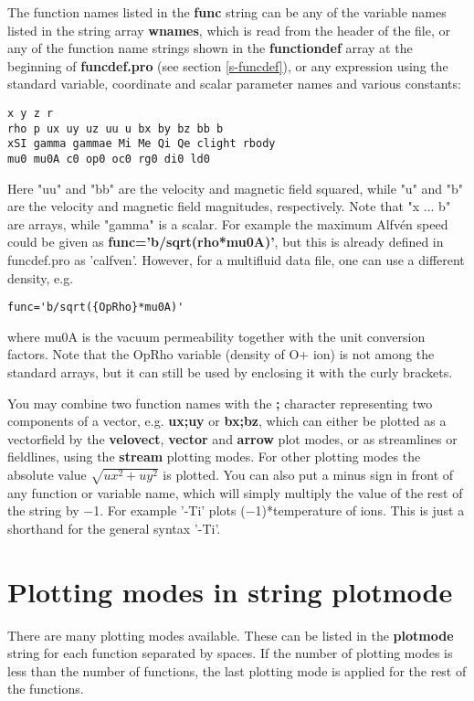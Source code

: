 \documentclass{article}
\begin{document}
   The function names listed in the {\bf func} string can be any of 
   the variable names listed in the string array {\bf wnames}, which is 
   read from the header of the file, or any of the function name strings 
   shown in the {\bf functiondef} array at the beginning of
   {\bf funcdef.pro} (see section \ref{s-funcdef}), 
   or any expression using the standard variable, 
   coordinate and scalar parameter names and various constants:
\begin{verbatim}
x y z r
rho p ux uy uz uu u bx by bz bb b
xSI gamma gammae Mi Me Qi Qe clight rbody
mu0 mu0A c0 op0 oc0 rg0 di0 ld0
\end{verbatim}
   Here "uu" and "bb" are the velocity and magnetic field squared, while
   "u" and "b" are the velocity and magnetic field magnitudes, 
   respectively. Note that "x ... b" are arrays, while  "gamma" is
   a scalar.  For example the maximum Alfv\'en 
   speed could be given as {\bf func='b/sqrt(rho*mu0A)'}, but this is already 
   defined in funcdef.pro as 'calfven'. However, for a multifluid data
   file, one can use a different density, e.g. 
\begin{verbatim}
func='b/sqrt({OpRho}*mu0A)'
\end{verbatim}
   where mu0A is the vacuum permeability together with the unit conversion
   factors.
   Note that the OpRho variable (density of O+ ion) is not among the standard
   arrays, but it can still be used by enclosing it with the curly brackets.

   You may combine two function names with the {\bf ;} character representing
   two components of a vector, 
   e.g. {\bf ux;uy} or {\bf bx;bz}, which can either be plotted as a 
   vectorfield by the {\bf velovect}, {\bf vector} and {\bf arrow} plot modes, 
   or as streamlines or fieldlines, using the {\bf stream} plotting modes.
   For other plotting modes the absolute value
   $\sqrt{ux^2+uy^2}$ is plotted.
   You can also put a minus sign in front of any function or variable
   name, which will simply multiply the value of the rest of the string by $-$1. 
   For example '-Ti' plots ($-$1)*temperature of ions. This is just a shorthand for
   the general syntax '-{Ti}'.

\section{Plotting modes in string plotmode \label{s-plotmode}}

There are many plotting modes available. 
These can be listed in the {\bf plotmode} string for each function separated 
by spaces. If the number of plotting modes is less than the number of functions,
the last plotting mode is applied for the rest of the functions.
\end{document}
